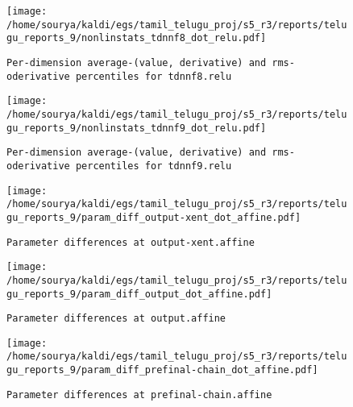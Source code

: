 \documentclass[prl,10pt,twocolumn]{revtex4}
\begin{document}
\newpage
\begin{figure}[h]
  \begin{center}
    \caption{\texttt{Per-dimension average-(value, derivative) and rms-oderivative percentiles for tdnnf8.relu}}
    \texttt{[image: /home/sourya/kaldi/egs/tamil\_telugu\_proj/s5\_r3/reports/telugu\_reports\_9/nonlinstats\_tdnnf8\_dot\_relu.pdf]}
  \end{center}
\end{figure}
\clearpage


\newpage
\begin{figure}[h]
  \begin{center}
    \caption{\texttt{Per-dimension average-(value, derivative) and rms-oderivative percentiles for tdnnf9.relu}}
    \texttt{[image: /home/sourya/kaldi/egs/tamil\_telugu\_proj/s5\_r3/reports/telugu\_reports\_9/nonlinstats\_tdnnf9\_dot\_relu.pdf]}
  \end{center}
\end{figure}
\clearpage


\newpage
\begin{figure}[h]
  \begin{center}
    \caption{\texttt{Parameter differences at output-xent.affine}}
    \texttt{[image: /home/sourya/kaldi/egs/tamil\_telugu\_proj/s5\_r3/reports/telugu\_reports\_9/param\_diff\_output-xent\_dot\_affine.pdf]}
  \end{center}
\end{figure}
\clearpage


\newpage
\begin{figure}[h]
  \begin{center}
    \caption{\texttt{Parameter differences at output.affine}}
    \texttt{[image: /home/sourya/kaldi/egs/tamil\_telugu\_proj/s5\_r3/reports/telugu\_reports\_9/param\_diff\_output\_dot\_affine.pdf]}
  \end{center}
\end{figure}
\clearpage


\newpage
\begin{figure}[h]
  \begin{center}
    \caption{\texttt{Parameter differences at prefinal-chain.affine}}
    \texttt{[image: /home/sourya/kaldi/egs/tamil\_telugu\_proj/s5\_r3/reports/telugu\_reports\_9/param\_diff\_prefinal-chain\_dot\_affine.pdf]}
  \end{center}
\end{figure}
\clearpage
\end{document}
